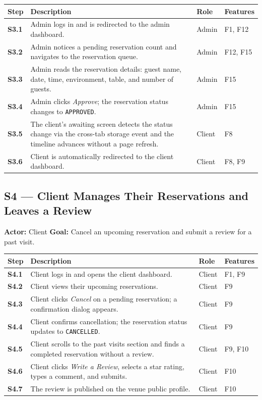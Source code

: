 \documentclass[12pt,a4paper,oneside]{report}
\begin{document}
\begin{longtable}{>{\bfseries}l L{6.2cm} l L{2.8cm}}
  \toprule
  Step & Description & Role & Features \\
  \midrule
  S3.1 & Admin logs in and is redirected to the admin dashboard. & Admin & F1, F12 \\
  S3.2 & Admin notices a pending reservation count and navigates to the
         reservation queue. & Admin & F12, F15 \\
  S3.3 & Admin reads the reservation details: guest name, date, time,
         environment, table, and number of guests. & Admin & F15 \\
  S3.4 & Admin clicks \emph{Approve}; the reservation status changes to
         \texttt{APPROVED}. & Admin & F15 \\
  S3.5 & The client's awaiting screen detects the status change via the
         cross-tab storage event and the timeline advances without a page
         refresh. & Client & F8 \\
  S3.6 & Client is automatically redirected to the client dashboard. & Client & F8, F9 \\
  \bottomrule
\end{longtable}

\subsection*{S4 --- Client Manages Their Reservations and Leaves a Review}
\begin{mdframed}[style=scenariobox]
\textbf{Actor:} Client \quad
\textbf{Goal:} Cancel an upcoming reservation and submit a review for a past visit.
\end{mdframed}

\begin{longtable}{>{\bfseries}l L{6.2cm} l L{2.8cm}}
  \toprule
  Step & Description & Role & Features \\
  \midrule
  S4.1 & Client logs in and opens the client dashboard. & Client & F1, F9 \\
  S4.2 & Client views their upcoming reservations. & Client & F9 \\
  S4.3 & Client clicks \emph{Cancel} on a pending reservation; a confirmation
         dialog appears. & Client & F9 \\
  S4.4 & Client confirms cancellation; the reservation status updates to
         \texttt{CANCELLED}. & Client & F9 \\
  S4.5 & Client scrolls to the past visits section and finds a completed
         reservation without a review. & Client & F9, F10 \\
  S4.6 & Client clicks \emph{Write a Review}, selects a star rating, types a
         comment, and submits. & Client & F10 \\
  S4.7 & The review is published on the venue public profile. & Client & F10 \\
  \bottomrule
\end{longtable}
\end{document}
